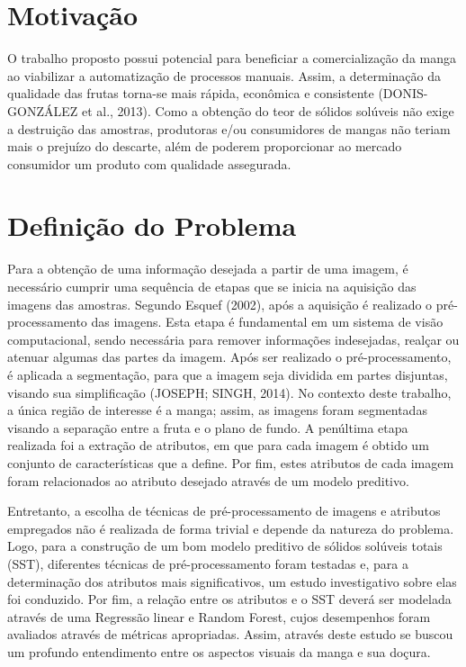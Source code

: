 \section{Motivação}

O trabalho proposto possui potencial para beneficiar a comercialização da manga ao viabilizar a automatização de processos manuais. Assim, a determinação da qualidade das frutas torna-se mais rápida, econômica e consistente (DONIS-GONZÁLEZ et al., 2013). Como a obtenção do teor de sólidos solúveis não exige a destruição das amostras, produtoras e/ou consumidores de mangas não teriam mais o prejuízo do descarte, além de poderem proporcionar ao mercado consumidor um produto com qualidade assegurada. 

\section{Definição do Problema}

Para a obtenção de uma informação desejada a partir de uma imagem, é necessário cumprir uma sequência de etapas que se inicia na aquisição das imagens das amostras. Segundo Esquef (2002), após a aquisição é realizado o pré-processamento das imagens. Esta etapa é 	fundamental em um sistema de visão computacional, sendo necessária para remover informações indesejadas, realçar ou atenuar algumas das partes da imagem. Após ser realizado o pré-processamento, é aplicada a segmentação, para que a imagem seja dividida em partes disjuntas, visando sua simplificação (JOSEPH; SINGH, 2014). No contexto deste trabalho, a única região de interesse é a manga; assim, as imagens foram segmentadas visando a separação entre a fruta e o plano de fundo. A penúltima etapa realizada foi a extração de atributos, em que para cada imagem é obtido um conjunto de características que a define. Por fim, estes atributos de cada imagem foram relacionados ao atributo desejado através de um modelo preditivo.

Entretanto, a escolha de técnicas de pré-processamento de imagens e atributos empregados não é realizada de forma trivial e depende da natureza do problema. Logo, para a construção de um bom modelo preditivo de sólidos solúveis totais (SST), diferentes técnicas de pré-processamento foram testadas e, para a determinação dos atributos mais significativos, um estudo investigativo sobre elas foi conduzido. Por fim, a relação entre os atributos e o SST deverá ser modelada através de uma Regressão linear e Random Forest, cujos desempenhos foram avaliados através de métricas apropriadas. Assim, através deste estudo se buscou um profundo entendimento entre os aspectos visuais da manga e sua doçura. 

